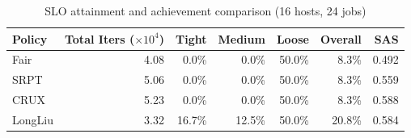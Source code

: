 \begin{table}[t]
\centering
\caption{SLO attainment and achievement comparison (16 hosts, 24 jobs)}
\label{tab:slo_16host}
\begin{tabular}{l|r|r|r|r|r|r}
\hline
Policy & Total Iters ($\times 10^4$) & Tight & Medium & Loose & Overall & SAS \\
\hline
Fair & 4.08 & 0.0\% & 0.0\% & 50.0\% & 8.3\% & 0.492 \\
SRPT & 5.06 & 0.0\% & 0.0\% & 50.0\% & 8.3\% & 0.559 \\
CRUX & 5.23 & 0.0\% & 0.0\% & 50.0\% & 8.3\% & 0.588 \\
LongLiu & 3.32 & 16.7\% & 12.5\% & 50.0\% & 20.8\% & 0.584 \\
\hline
\end{tabular}
\end{table}
